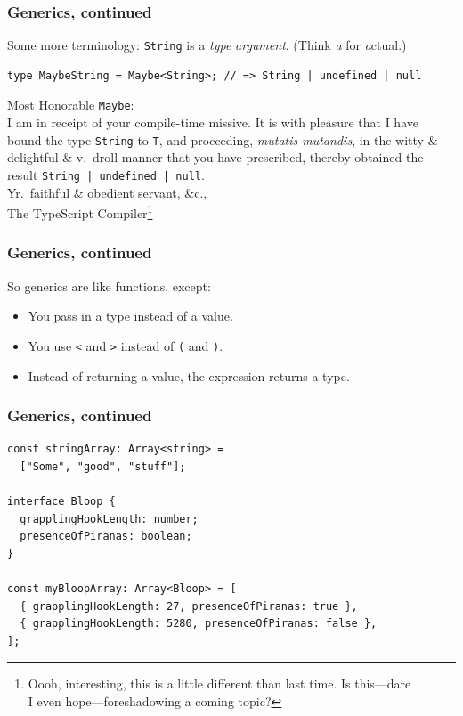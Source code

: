 \documentclass[aspectratio=169]{beamer}
\begin{document}
\begin{frame}[fragile]
  \frametitle{Generics, continued}
  \small

  Some more terminology: \texttt{String} is a \emph{type} \textit{argument}.
  (Think \textit{a} for \textit{a}ctual.)

  \vspace{1em}

  \footnotesize
  \begin{verbatim}
type MaybeString = Maybe<String>; // => String | undefined | null
  \end{verbatim}
  \small

  \vspace{1em}

  \begin{tcolorbox}
    Most Honorable \texttt{Maybe}: \\

    I am in receipt of your compile-time missive. It is with pleasure that
    I have bound the type \texttt{String} to \texttt{T}, and proceeding,
    \textit{mutatis mutandis}, in the witty \& delightful \& v.\ droll manner
    that you have prescribed, thereby obtained the result
    \texttt{String | undefined | null}. \\

    Yr.\ faithful \& obedient servant, \&c., \\
    The TypeScript Compiler\footnote{Oooh, interesting, this is a little
      different than last time. Is this---dare \\ I even hope---foreshadowing
      a coming topic?}
  \end{tcolorbox}
\end{frame}


\begin{frame}
  \frametitle{Generics, continued}

  So generics are like functions, except: \\

  \begin{itemize}
    \item You pass in a type instead of a value.
    \item You use \texttt{<} and \texttt{>} instead of \texttt{(} and
          \texttt{)}.
    \item Instead of returning a value, the expression returns a type.
  \end{itemize}
\end{frame}

\begin{frame}[fragile]
  \frametitle{Generics, continued}

  \begin{verbatim}
const stringArray: Array<string> =
  ["Some", "good", "stuff"];

interface Bloop {
  grapplingHookLength: number;
  presenceOfPiranas: boolean;
}

const myBloopArray: Array<Bloop> = [
  { grapplingHookLength: 27, presenceOfPiranas: true },
  { grapplingHookLength: 5280, presenceOfPiranas: false },
];
  \end{verbatim}
\end{frame}
\end{document}
